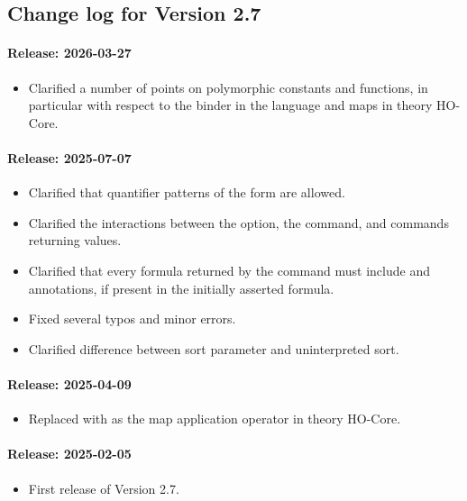 \subsection{Change log for Version 2.7}

\paragraph{Release: 2026-03-27}
\begin{itemize}
\item Clarified a number of points on polymorphic constants and functions, in particular
with respect to the  binder in the language and maps in theory HO-Core.
\end{itemize}

\paragraph{Release: 2025-07-07}
\begin{itemize}
\item Clarified that quantifier patterns of the form  are allowed.
\item Clarified the interactions between the  option, the  command, and commands returning values.
\item Clarified that every formula returned by the  command must include  and  annotations, if present in the initially asserted formula.
\item Fixed several typos and minor errors.
\item Clarified difference between sort parameter and uninterpreted sort.
\end{itemize}

\paragraph{Release: 2025-04-09}
\begin{itemize}
\item Replaced \ter{\_} with  as the map application operator in theory HO-Core.
\end{itemize}

\paragraph{Release: 2025-02-05}
\begin{itemize}
\item First release of Version 2.7.
\end{itemize}

